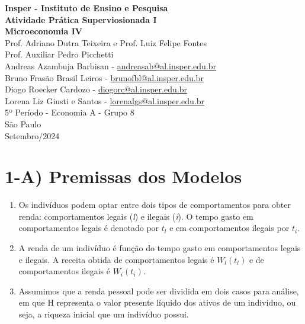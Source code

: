 \documentclass[12pt]{article}
\begin{document}
\begin{titlepage}
    \centering
    \vspace*{1cm}
    \Large\textbf{Insper - Instituto de Ensino e Pesquisa}\\
    \vspace{1.5cm}
    \Large\textbf{Atividade Prática Superviosionada I}\\
    \textbf{Microeconomia IV}\\
    \vspace{1.5cm}
    Prof. Adriano Dutra Teixeira e Prof. Luiz Felipe Fontes\\
    Prof. Auxiliar Pedro Picchetti \\
    \vfill
    \normalsize
    Andreas Azambuja Barbisan - \href{mailto:andreasab@al.insper.edu.br}
    {andreasab@al.insper.edu.br}\\
    Bruno Frasão Brasil Leiros - \href{mailto:brunofbl@al.insper.edu.br}{brunofbl@al.insper.edu.br}\\
    Diogo Roecker Cardozo - \href{mailto:diogorc@al.insper.edu.br}
    {diogorc@al.insper.edu.br}\\
    Lorena Liz Giusti e Santos - \href{mailto:lorenalgs@al.insper.edu.br}{lorenalgs@al.insper.edu.br}\\

    5º Período - Economia A - Grupo 8\\
    \vfill
    São Paulo\\
    Setembro/2024
\end{titlepage}

\pagestyle{fancy}
\fancyhf{}
\rhead{\thepage}

\section*{1-A) Premissas dos Modelos}

\begin{enumerate}
    \item Os indivíduos podem optar entre dois tipos de comportamentos para obter renda: comportamentos legais (\emph{l}) e ilegais (\emph{i}). O tempo gasto em comportamentos legais é denotado por $t_{l}$ e em comportamentos ilegais por $t_{i}$.
    
    \item A renda de um indivíduo é função do tempo gasto em comportamentos legais e ilegais. A receita obtida de comportamentos legais é $W_{l}(t_{l})$ e de comportamentos ilegais é $W_{i}(t_{i})$.
    
    \item Assumimos que a renda pessoal pode ser dividida em dois casos para análise, em que H representa o valor presente líquido dos ativos de um indivíduo, ou seja, a riqueza inicial que um indivíduo possui.
\end{enumerate}
\end{document}
